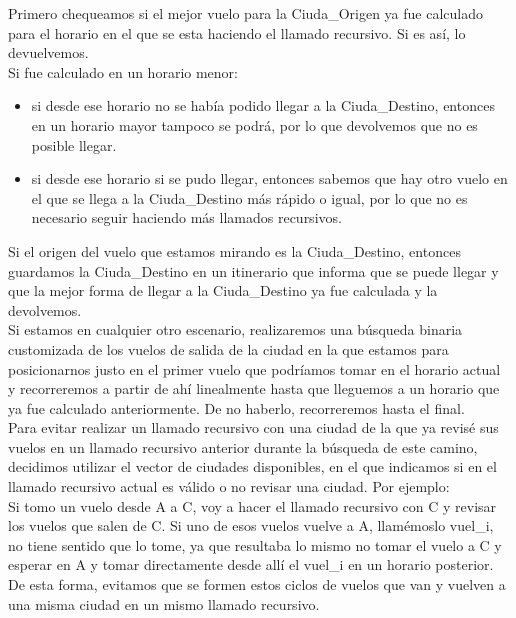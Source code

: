 \documentclass[10pt,a4paper]{article}
\begin{document}
Primero chequeamos si el mejor vuelo para la Ciuda\_Origen ya fue calculado para el horario en el que se esta haciendo el llamado recursivo. Si es así, lo devuelvemos.\\

Si fue calculado en un horario menor:\\
\begin{itemize}
\item si desde ese horario no se había podido llegar a la Ciuda\_Destino, entonces en un horario mayor tampoco se podrá, por lo que devolvemos que no es posible llegar.
\item si desde ese horario si se pudo llegar, entonces sabemos que hay otro vuelo en el que se llega a la Ciuda\_Destino más rápido o igual, por lo que no es necesario seguir haciendo más llamados recursivos.\\
\end{itemize}

Si el origen del vuelo que estamos mirando es la Ciuda\_Destino, entonces guardamos la Ciuda\_Destino en un itinerario que informa que se puede llegar y que la mejor forma de llegar a la Ciuda\_Destino ya fue calculada y la devolvemos.\\ 

Si estamos en cualquier otro escenario, realizaremos una búsqueda binaria customizada de los vuelos de salida de la ciudad en la que estamos para posicionarnos justo en el primer vuelo que podríamos tomar en el horario actual y recorreremos a partir de ahí linealmente hasta que lleguemos a un horario que ya fue calculado anteriormente. De no haberlo, recorreremos hasta el final.\\

Para evitar realizar un llamado recursivo con una ciudad de la que ya revisé sus vuelos en un llamado recursivo anterior durante la búsqueda de este camino, decidimos utilizar el vector de ciudades disponibles, en el que indicamos si en el llamado recursivo actual es válido o no revisar una ciudad. Por ejemplo:\\

Si tomo un vuelo desde A a C, voy a hacer el llamado recursivo con C y revisar los vuelos que salen de C. Si uno de esos vuelos vuelve a A, llamémoslo vuel\_i, no tiene sentido que lo tome, ya que resultaba lo mismo no tomar el vuelo a C y esperar en A y tomar directamente desde allí el vuel\_i en un horario posterior. De esta forma, evitamos que se formen estos ciclos de vuelos que van y vuelven a una misma ciudad en un mismo llamado recursivo.\\
\end{document}
